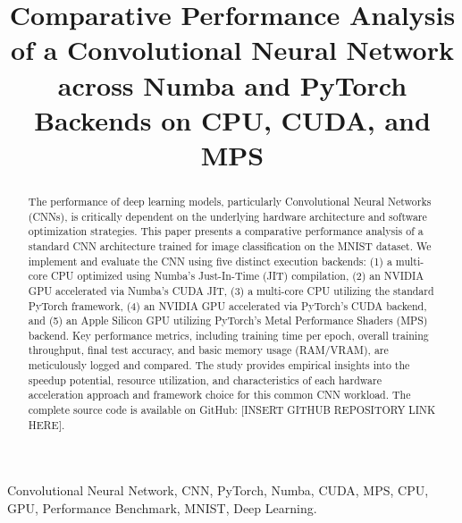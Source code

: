 \documentclass[conference]{IEEEtran} %
\begin{document}
\title{Comparative Performance Analysis of a Convolutional Neural Network across Numba and PyTorch Backends on CPU, CUDA, and MPS}

\author{
}

\maketitle

\begin{abstract}
The performance of deep learning models, particularly Convolutional Neural Networks (CNNs), is critically dependent on the underlying hardware architecture and software optimization strategies. This paper presents a comparative performance analysis of a standard CNN architecture trained for image classification on the MNIST dataset. We implement and evaluate the CNN using five distinct execution backends: (1) a multi-core CPU optimized using Numba's Just-In-Time (JIT) compilation, (2) an NVIDIA GPU accelerated via Numba's CUDA JIT, (3) a multi-core CPU utilizing the standard PyTorch framework, (4) an NVIDIA GPU accelerated via PyTorch's CUDA backend, and (5) an Apple Silicon GPU utilizing PyTorch's Metal Performance Shaders (MPS) backend. Key performance metrics, including training time per epoch, overall training throughput, final test accuracy, and basic memory usage (RAM/VRAM), are meticulously logged and compared. The study provides empirical insights into the speedup potential, resource utilization, and characteristics of each hardware acceleration approach and framework choice for this common CNN workload. The complete source code is available on GitHub: [INSERT GITHUB REPOSITORY LINK HERE].
\end{abstract}

\begin{IEEEkeywords}
Convolutional Neural Network, CNN, PyTorch, Numba, CUDA, MPS, CPU, GPU, Performance Benchmark, MNIST, Deep Learning.
\end{IEEEkeywords}
\end{document}
